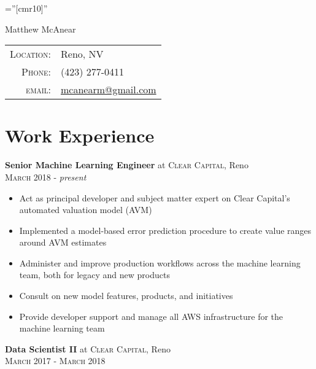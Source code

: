 \documentclass[a4paper,10pt]{article}
\begin{document}
\pagestyle{empty} %

\font\fb=''[cmr10]'' %

\par{\centering
		{\Huge Matthew McAnear
	}\bigskip\par}

\begin{tabular}{rl}
    \textsc{Location:}  & Reno, NV\\
    \textsc{Phone:}     & (423) 277-0411\\
    \textsc{email:}     & \href{mailto:mcanearm@gmail.com}{mcanearm@gmail.com}
\end{tabular}


\vspace{5mm}

\section{Work Experience}

\textbf{Senior Machine Learning Engineer} at \textsc{Clear Capital}, Reno \\
\textsc{March 2018} - \emph{present} \\
\small
\vspace{-5mm}
\begin{itemize}
    \item Act as principal developer and subject matter expert on Clear Capital's automated valuation model (AVM)
    \item Implemented a model-based error prediction procedure to create value ranges around AVM estimates
    \item Administer and improve production workflows across the machine learning team, both for legacy and new products
    \item Consult on new model features, products, and initiatives
    \item Provide developer support and manage all AWS infrastructure for the machine learning team
\end{itemize}

\normalsize
\textbf{Data Scientist II} at \textsc{Clear Capital}, Reno \\
\textsc{March 2017} - \textsc{March 2018} \\
\end{document}
